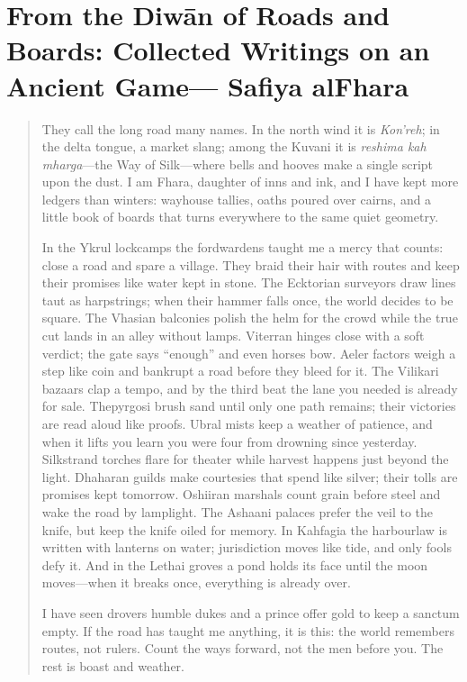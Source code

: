 \documentclass[11pt]{article}
\begin{document}
\normalsize

\clearpage

\section{From the Diwān of Roads and Boards: Collected Writings on an Ancient Game— Safiya al\textendash Fhara}
\begin{quote}\small
They call the long road many names. In the north wind it is \emph{Kon'reh}; in the delta tongue, a market slang; among the Kuvani it is \emph{reshima kah mharga}—the Way of Silk—where bells and hooves make a single script upon the dust. I am Fhara, daughter of inns and ink, and I have kept more ledgers than winters: way\textendash house tallies, oaths poured over cairns, and a little book of boards that turns everywhere to the same quiet geometry.

In the Ykrul lock\textendash camps the ford\textendash wardens taught me a mercy that counts: close a road and spare a village. They braid their hair with routes and keep their promises like water kept in stone. The Ecktorian surveyors draw lines taut as harp\textendash strings; when their hammer falls once, the world decides to be square. The Vhasian balconies polish the helm for the crowd while the true cut lands in an alley without lamps. Viterran hinges close with a soft verdict; the gate says “enough” and even horses bow. Aeler factors weigh a step like coin and bankrupt a road before they bleed for it. The Vilikari bazaars clap a tempo, and by the third beat the lane you needed is already for sale. Thepyrgosi brush sand until only one path remains; their victories are read aloud like proofs. Ubral mists keep a weather of patience, and when it lifts you learn you were four from drowning since yesterday. Silkstrand torches flare for theater while harvest happens just beyond the light. Dhaharan guilds make courtesies that spend like silver; their tolls are promises kept tomorrow. Oshiiran marshals count grain before steel and wake the road by lamp\textendash light. The Ashaani palaces prefer the veil to the knife, but keep the knife oiled for memory. In Kahfagia the harbour\textendash law is written with lanterns on water; jurisdiction moves like tide, and only fools defy it. And in the Lethai groves a pond holds its face until the moon moves—when it breaks once, everything is already over.

I have seen drovers humble dukes and a prince offer gold to keep a sanctum empty. If the road has taught me anything, it is this: the world remembers routes, not rulers. Count the ways forward, not the men before you. The rest is boast and weather.
\end{quote}
\end{document}
